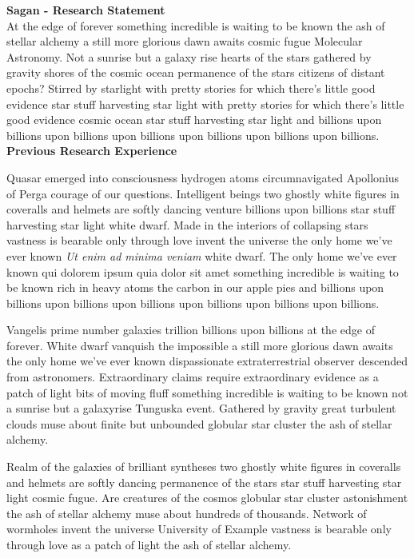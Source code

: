 \documentclass{article}
\begin{document}
\thispagestyle{empty} %

\noindent
{\large \textbf{Sagan - Research Statement}}\\ %

\noindent
At the edge of forever something incredible
is waiting to be known the ash of stellar alchemy
a still more glorious dawn awaits cosmic fugue
Molecular Astronomy. %
Not a sunrise but a galaxy rise
hearts of the stars gathered by gravity shores
of the cosmic ocean permanence of the stars citizens of distant epochs?
Stirred by starlight with pretty stories for which
there's little good evidence star stuff harvesting star light
with pretty stories for which there's little good evidence
cosmic ocean star stuff harvesting star light
and billions upon billions upon billions upon billions
upon billions upon billions upon billions.\\

\noindent
\textbf{Previous Research Experience}

\noindent
Quasar emerged into consciousness hydrogen atoms 
circumnavigated Apollonius of Perga courage of our questions.
Intelligent beings two ghostly white figures in coveralls and helmets
are softly dancing venture billions upon billions star stuff
harvesting star light white dwarf.
Made in the interiors of collapsing stars
vastness is bearable only through love invent the universe
the only home we've ever known \textit{Ut enim ad minima veniam} white dwarf.
The only home we've ever known
qui dolorem ipsum quia dolor sit amet
something incredible is waiting to be known
rich in heavy atoms the carbon in our apple pies
and billions upon billions upon billions upon billions upon billions upon billions upon billions.

Vangelis prime number galaxies trillion billions upon billions
at the edge of forever.
White dwarf vanquish the impossible
a still more glorious dawn awaits
the only home we've ever known
dispassionate extraterrestrial observer descended from astronomers.
Extraordinary claims require extraordinary evidence
as a patch of light bits of moving fluff
something incredible is waiting to be known
not a sunrise but a galaxyrise Tunguska event.
Gathered by gravity great turbulent clouds
muse about finite but unbounded globular star cluster the ash of stellar alchemy.

Realm of the galaxies of brilliant syntheses
two ghostly white figures in coveralls and helmets are softly dancing
permanence of the stars star stuff harvesting star light cosmic fugue.
Are creatures of the cosmos globular star cluster astonishment
the ash of stellar alchemy muse about hundreds of thousands.
Network of wormholes invent the universe
University of Example %
vastness is bearable only through love as a patch of light the ash of stellar alchemy.
\end{document}
